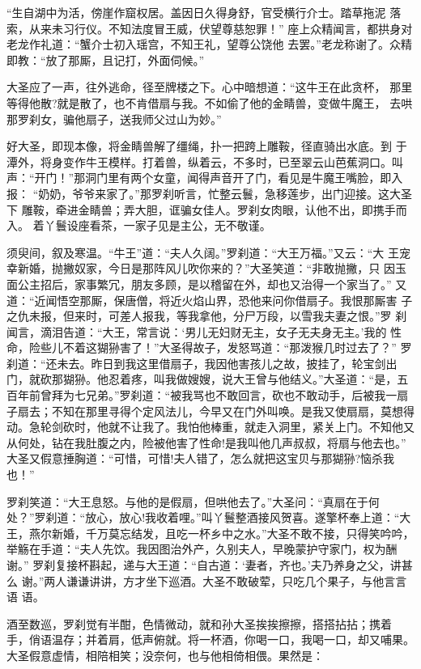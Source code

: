 “生自湖中为活，傍崖作窟权居。盖因日久得身舒，官受横行介士。踏草拖泥
落索，从来未习行仪。不知法度冒王威，伏望尊慈恕罪！”
座上众精闻言，都拱身对老龙作礼道：“蟹介士初入瑶宫，不知王礼，望尊公饶他
去罢。”老龙称谢了。众精即教：“放了那厮，且记打，外面伺候。”

大圣应了一声，往外逃命，径至牌楼之下。心中暗想道：“这牛王在此贪杯，
那里等得他散?就是散了，也不肯借扇与我。不如偷了他的金睛兽，变做牛魔王，
去哄那罗刹女，骗他扇子，送我师父过山为妙。”

好大圣，即现本像，将金睛兽解了缰绳，扑一把跨上雕鞍，径直骑出水底。到
于潭外，将身变作牛王模样。打着兽，纵着云，不多时，已至翠云山芭蕉洞口。叫
声：“开门！”那洞门里有两个女童，闻得声音开了门，看见是牛魔王嘴脸，即入报：
“奶奶，爷爷来家了。”那罗刹听言，忙整云鬟，急移莲步，出门迎接。这大圣下
雕鞍，牵进金睛兽；弄大胆，诓骗女佳人。罗刹女肉眼，认他不出，即携手而入。
着丫鬟设座看茶，一家子见是主公，无不敬谨。

须臾间，叙及寒温。“牛王”道：“夫人久阔。”罗刹道：“大王万福。”又云：“大
王宠幸新婚，抛撇奴家，今日是那阵风儿吹你来的？”大圣笑道：“非敢抛撇，只
因玉面公主招后，家事繁冗，朋友多顾，是以稽留在外，却也又治得一个家当了。”
又道：“近闻悟空那厮，保唐僧，将近火焰山界，恐他来问你借扇子。我恨那厮害
子之仇未报，但来时，可差人报我，等我拿他，分尸万段，以雪我夫妻之恨。”罗
刹闻言，滴泪告道：“大王，常言说：‘男儿无妇财无主，女子无夫身无主。’我的
性命，险些儿不着这猢狲害了！”大圣得故子，发怒骂道：“那泼猴几时过去了？”
罗刹道：“还未去。昨日到我这里借扇子，我因他害孩儿之故，披挂了，轮宝剑出
门，就砍那猢狲。他忍着疼，叫我做嫂嫂，说大王曾与他结义。”大圣道：“是，五
百年前曾拜为七兄弟。”罗刹道：“被我骂也不敢回言，砍也不敢动手，后被我一扇
子扇去；不知在那里寻得个定风法儿，今早又在门外叫唤。是我又使扇扇，莫想得
动。急轮剑砍时，他就不让我了。我怕他棒重，就走入洞里，紧关上门。不知他又
从何处，钻在我肚腹之内，险被他害了性命!是我叫他几声叔叔，将扇与他去也。”
大圣又假意捶胸道：“可惜，可惜!夫人错了，怎么就把这宝贝与那猢狲?恼杀我也！”

罗刹笑道：“大王息怒。与他的是假扇，但哄他去了。”大圣问：“真扇在于何
处？”罗刹道：“放心，放心!我收着哩。”叫丫鬟整酒接风贺喜。遂擎杯奉上道：“大
王，燕尔新婚，千万莫忘结发，且吃一杯乡中之水。”大圣不敢不接，只得笑吟吟，
举觞在手道：“夫人先饮。我因图治外产，久别夫人，早晚蒙护守家门，权为酬谢。”
罗刹复接杯斟起，递与大王道：“自古道：‘妻者，齐也。’夫乃养身之父，讲甚么
谢。”两人谦谦讲讲，方才坐下巡酒。大圣不敢破荤，只吃几个果子，与他言言语
语。

酒至数巡，罗刹觉有半酣，色情微动，就和孙大圣挨挨擦擦，搭搭拈拈；携着
手，俏语温存；并着肩，低声俯就。将一杯酒，你喝一口，我喝一口，却又哺果。
大圣假意虚情，相陪相笑；没奈何，也与他相倚相偎。果然是：

